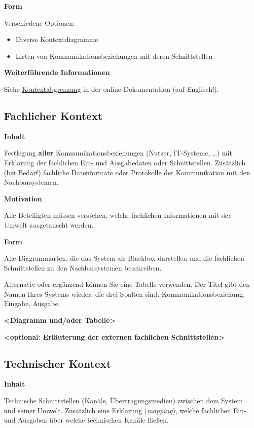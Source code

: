 \documentclass[
]{article}
\begin{document}
\textbf{Form}

Verschiedene Optionen:

\begin{itemize}
\item
  Diverse Kontextdiagramme
\item
  Listen von Kommunikationsbeziehungen mit deren Schnittstellen
\end{itemize}

\textbf{Weiterführende Informationen}

Siehe \href{https://docs.arc42.org/section-3/}{Kontextabgrenzung} in der
online-Dokumentation (auf Englisch!).

\subsection{Fachlicher Kontext}\label{_fachlicher_kontext}

\textbf{Inhalt}

Festlegung \textbf{aller} Kommunikationsbeziehungen (Nutzer, IT-Systeme,
\ldots\hspace{0pt}) mit Erklärung der fachlichen Ein- und Ausgabedaten
oder Schnittstellen. Zusätzlich (bei Bedarf) fachliche Datenformate oder
Protokolle der Kommunikation mit den Nachbarsystemen.

\textbf{Motivation}

Alle Beteiligten müssen verstehen, welche fachlichen Informationen mit
der Umwelt ausgetauscht werden.

\textbf{Form}

Alle Diagrammarten, die das System als Blackbox darstellen und die
fachlichen Schnittstellen zu den Nachbarsystemen beschreiben.

Alternativ oder ergänzend können Sie eine Tabelle verwenden. Der Titel
gibt den Namen Ihres Systems wieder; die drei Spalten sind:
Kommunikationsbeziehung, Eingabe, Ausgabe.

\textbf{\textless Diagramm und/oder Tabelle\textgreater{}}

\textbf{\textless optional: Erläuterung der externen fachlichen
Schnittstellen\textgreater{}}

\subsection{Technischer Kontext}\label{_technischer_kontext}

\textbf{Inhalt}

Technische Schnittstellen (Kanäle, Übertragungsmedien) zwischen dem
System und seiner Umwelt. Zusätzlich eine Erklärung (\emph{mapping}),
welche fachlichen Ein- und Ausgaben über welche technischen Kanäle
fließen.
\end{document}
